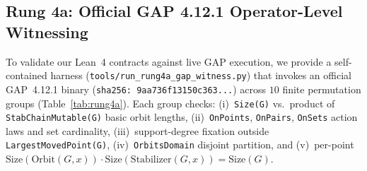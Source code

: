 \documentclass[11pt,a4paper]{article}
\begin{document}
\subsection{Rung 4a: Official GAP 4.12.1 Operator-Level Witnessing}
To validate our Lean~4 contracts against live GAP execution, we provide a self-contained harness (\texttt{tools/\allowbreak run\_rung4a\_\allowbreak gap\_witness.py}) that invokes an official GAP~4.12.1 binary (\texttt{sha256: 9aa736f13150c363...}) across $10$ finite permutation groups (Table~\ref{tab:rung4a}). Each group checks: (i)~\texttt{Size(G)} vs.\ product of \texttt{StabChainMutable(\allowbreak G)} basic orbit lengths, (ii)~\texttt{OnPoints}, \texttt{OnPairs}, \texttt{OnSets} action laws and set cardinality, (iii)~support-degree fixation outside \texttt{LargestMovedPoint(G)}, (iv)~\texttt{OrbitsDomain} disjoint partition, and (v)~per-point $\mathrm{Size}(\mathrm{Orbit}(G,x)) \cdot \mathrm{Size}(\mathrm{Stabilizer}(G,x)) = \mathrm{Size}(G)$.

\begin{table}[h!]
\centering
\small
{}
\caption{Rung~4a operator-level witness matrix executed on an official GAP~4.12.1 binary. A separate synthetic negative event confirms the \texttt{violation} verdict path is reachable. Because this is a distribution binary without a pinned Nix derivation, evidence caps strictly at Rung~4a.}
\label{tab:rung4a}
\end{table}
\end{document}
